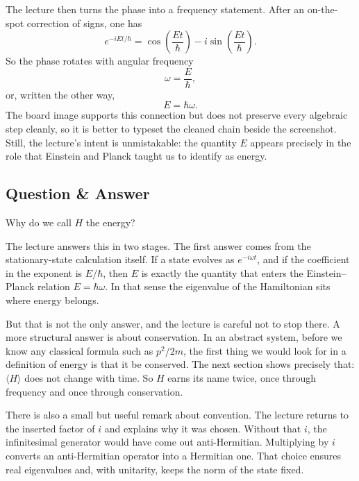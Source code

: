 The lecture then turns the phase into a frequency statement. After an on-the-spot correction of signs, one has
\begin{equation}
e^{-iEt/\hbar}
=
\cos\!\left(\frac{Et}{\hbar}\right)
-
i\sin\!\left(\frac{Et}{\hbar}\right).
\end{equation}
So the phase rotates with angular frequency
\begin{equation}
\omega = \frac{E}{\hbar},
\end{equation}
or, written the other way,
\begin{equation}
E=\hbar\omega.
\end{equation}
The board image supports this connection but does not preserve every algebraic step cleanly, so it is better to typeset the cleaned chain beside the screenshot. Still, the lecture's intent is unmistakable: the quantity \(E\) appears precisely in the role that Einstein and Planck taught us to identify as energy.

\subsection{Question \& Answer}

Why do we call \(H\) the energy?

The lecture answers this in two stages. The first answer comes from the stationary-state calculation itself. If a state evolves as \(e^{-i\omega t}\), and if the coefficient in the exponent is \(E/\hbar\), then \(E\) is exactly the quantity that enters the Einstein--Planck relation \(E=\hbar\omega\). In that sense the eigenvalue of the Hamiltonian sits where energy belongs.

But that is not the only answer, and the lecture is careful not to stop there. A more structural answer is about conservation. In an abstract system, before we know any classical formula such as \(p^2/2m\), the first thing we would look for in a definition of energy is that it be conserved. The next section shows precisely that: \(\langle H\rangle\) does not change with time. So \(H\) earns its name twice, once through frequency and once through conservation.

There is also a small but useful remark about convention. The lecture returns to the inserted factor of \(i\) and explains why it was chosen. Without that \(i\), the infinitesimal generator would have come out anti-Hermitian. Multiplying by \(i\) converts an anti-Hermitian operator into a Hermitian one. That choice ensures real eigenvalues and, with unitarity, keeps the norm of the state fixed.

